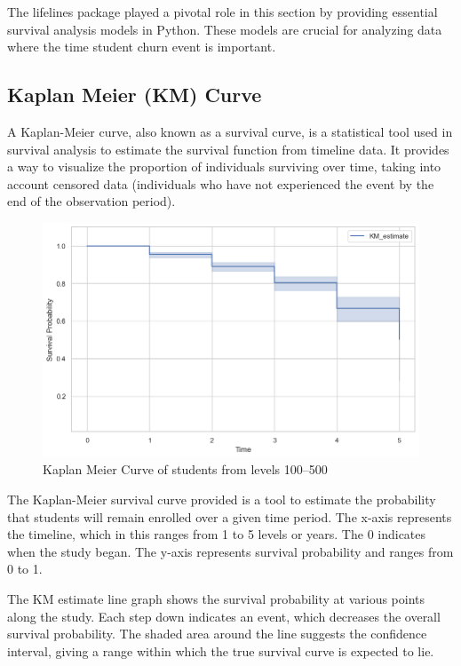 \documentclass[12pt]{report} %
\begin{document}
The lifelines package played a pivotal role in this section by providing essential survival analysis models in Python. These models are crucial for analyzing data where the time student churn event is important. 


\subsection{Kaplan Meier (KM) Curve}

A Kaplan-Meier curve, also known as a survival curve, is a statistical tool used in survival analysis to estimate the survival function from timeline data. It provides a way to visualize the proportion of individuals surviving over time, taking into account censored data (individuals who have not experienced the event by the end of the observation period).
\begin{figure}[H]
    \centering
    \includegraphics[width=1\linewidth]{Figure 4/4.1.png}
    \caption{Kaplan Meier Curve of students from levels 100–500}
\end{figure}

The Kaplan-Meier survival curve provided is a tool to estimate the probability that students will remain enrolled over a given time period. The x-axis represents the timeline, which in this ranges from 1 to 5 levels or years. The 0 indicates when the study began. The y-axis represents survival probability and ranges from 0 to 1.


The KM estimate line graph shows the survival probability at various points along the study. Each step down indicates an event, which decreases the overall survival probability. The shaded area around the line suggests the confidence interval, giving a range within which the true survival curve is expected to lie.
\end{document}
